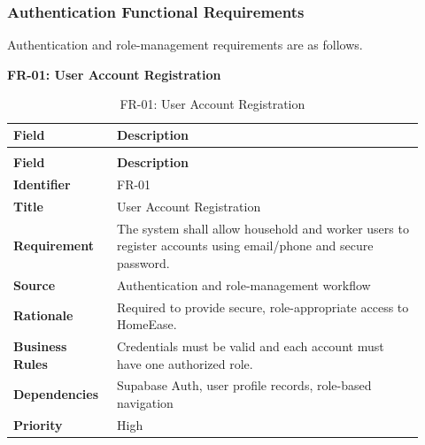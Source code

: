 \documentclass[12pt,a4paper]{article}
\begin{document}
\subsubsection{Authentication Functional Requirements}
Authentication and role-management requirements are as follows.

\noindent\textbf{FR-01: User Account Registration}\par
\vspace{4pt}
\begingroup\small\setlength{\tabcolsep}{4pt}\renewcommand{\arraystretch}{1.15}
\begin{longtable}{|>{\raggedright\arraybackslash}p{0.22\linewidth}|>{\raggedright\arraybackslash}p{0.70\linewidth}|}
\caption{FR-01: User Account Registration}\label{tab:fr-01}\\
\hline
\textbf{Field} & \textbf{Description} \\ \hline
\endfirsthead
\multicolumn{2}{c}{Table \thetable\ User Account Registration (continued)}\\
\hline
\textbf{Field} & \textbf{Description} \\ \hline
\endhead
\textbf{Identifier} & FR-01 \\ \hline
\textbf{Title} & User Account Registration \\ \hline
\textbf{Requirement} & The system shall allow household and worker users to register accounts using email/\allowbreak{}phone and secure password. \\ \hline
\textbf{Source} & Authentication and role-management workflow \\ \hline
\textbf{Rationale} & Required to provide secure, role-appropriate access to HomeEase. \\ \hline
\textbf{Business Rules} & Credentials must be valid and each account must have one authorized role. \\ \hline
\textbf{Dependencies} & Supabase Auth, user profile records, role-based navigation \\ \hline
\textbf{Priority} & High \\ \hline
\end{longtable}
\endgroup
\end{document}
